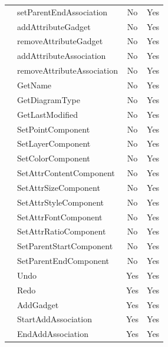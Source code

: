 \documentclass[12pt]{article}
\begin{document}
\begin{longtable}{|l|l|c|c|}
        & setParentEndAssociation        & No              & Yes           \\
        & addAttributeGadget             & No              & Yes           \\
        & removeAttributeGadget          & No              & Yes           \\
        & addAttributeAssociation        & No              & Yes           \\
        & removeAttributeAssociation     & No              & Yes           \\
        & GetName                        & No              & Yes           \\
        & GetDiagramType                 & No              & Yes           \\
        & GetLastModified                & No              & Yes           \\
        & SetPointComponent              & No              & Yes           \\
        & SetLayerComponent              & No              & Yes           \\
        & SetColorComponent              & No              & Yes           \\
        & SetAttrContentComponent        & No              & Yes           \\
        & SetAttrSizeComponent           & No              & Yes           \\
        & SetAttrStyleComponent          & No              & Yes           \\
        & SetAttrFontComponent           & No              & Yes           \\
        & SetAttrRatioComponent          & No              & Yes           \\
        & SetParentStartComponent        & No              & Yes           \\
        & SetParentEndComponent          & No              & Yes           \\
        & Undo                           & Yes             & Yes           \\
        & Redo                           & Yes             & Yes           \\
        & AddGadget                      & Yes             & Yes           \\
        & StartAddAssociation            & Yes             & Yes           \\
        & EndAddAssociation              & Yes             & Yes           \\

\end{longtable}
\end{document}
